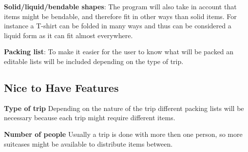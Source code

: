 \textbf{Solid/liquid/bendable shapes}:
The program will also take in account that items might be bendable, and therefore fit in other ways than solid items. For instance a T-shirt can be folded in many ways and thus can be considered a liquid form as it can fit almost everywhere.
\newline

\textbf{Packing list}:
To make it easier for the user to know what will be packed an editable lists will be included depending on the type of trip.
\newline


\subsection{Nice to Have Features}

\textbf{Type of trip}
Depending on the nature of the trip different packing lists will be necessary because each trip might require different items.
\newline

\textbf{Number of people}
Usually a trip is done with more then one person, so more suitcases might be available to distribute items between.
\newline